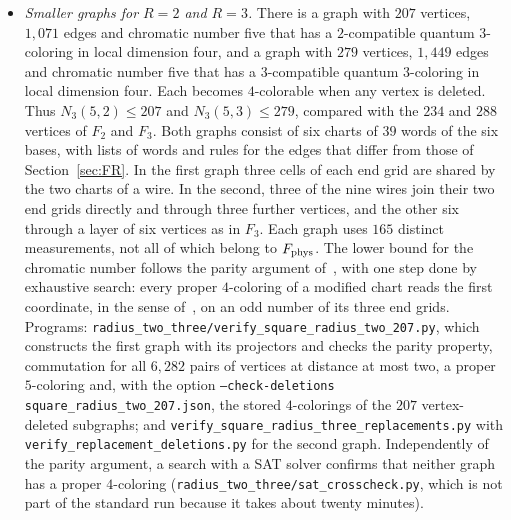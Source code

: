 \begin{itemize}
\item[(C3)] \emph{Smaller graphs for $R=2$ and $R=3$.} There is a graph with $207$ vertices, $1{,}071$ edges and chromatic number five that has a $2$-compatible quantum $3$-coloring in local dimension four, and a graph with $279$ vertices, $1{,}449$ edges and chromatic number five that has a $3$-compatible quantum $3$-coloring in local dimension four. Each becomes $4$-colorable when any vertex is deleted. Thus $N_3(5,2)\le207$ and $N_3(5,3)\le279$, compared with the $234$ and $288$ vertices of $F_2$ and $F_3$. Both graphs consist of six charts of $39$ words of the six bases, with lists of words and rules for the edges that differ from those of Section~\ref{sec:FR}. In the first graph three cells of each end grid are shared by the two charts of a wire. In the second, three of the nine wires join their two end grids directly and through three further vertices, and the other six through a layer of six vertices as in $F_3$. Each graph uses $165$ distinct measurements, not all of which belong to $F_{\rm phys}$. The lower bound for the chromatic number follows the parity argument of~\cite[Theorem~2.4]{Z}, with one step done by exhaustive search: every proper $4$-coloring of a modified chart reads the first coordinate, in the sense of~\cite[Section~2.4]{Z}, on an odd number of its three end grids. Programs: \texttt{radius\_two\_three/verify\_square\_radius\_two\_207.py}, which constructs the first graph with its projectors and checks the parity property, commutation for all $6{,}282$ pairs of vertices at distance at most two, a proper $5$-coloring and, with the option \texttt{--check-deletions square\_radius\_two\_207.json}, the stored $4$-colorings of the $207$ vertex-deleted subgraphs; and \texttt{verify\_square\_radius\_three\_replacements.py} with \texttt{verify\_replacement\_deletions.py} for the second graph. Independently of the parity argument, a search with a SAT solver confirms that neither graph has a proper $4$-coloring (\texttt{radius\_two\_three/sat\_crosscheck.py}, which is not part of the standard run because it takes about twenty minutes).


\end{itemize}
